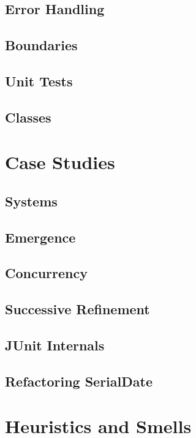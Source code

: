 \documentclass[a4paper, twocolumn]{article}
\begin{document}
\subsection{Error Handling}

\subsection{Boundaries}

\subsection{Unit Tests}

\subsection{Classes}


\section{Case Studies}

\subsection{Systems}

\subsection{Emergence}

\subsection{Concurrency}

\subsection{Successive Refinement}

\subsection{JUnit Internals}

\subsection{Refactoring SerialDate}


\section{Heuristics and Smells}
\end{document}
